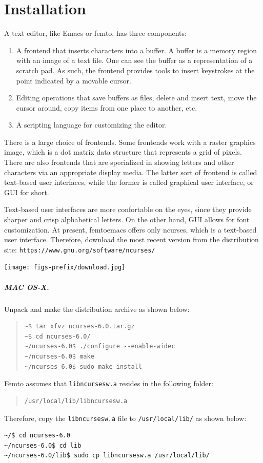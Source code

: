 \documentclass[a4paper,12pt]{book}
\begin{document}
\chapter{Installation}  
A text editor, like Emacs or femto, has three components:
\begin{enumerate}
\item A frontend that inserts characters into a buffer.
A buffer is a memory region with an image of a
text file. One can see the buffer as a representation
of a scratch pad. As such, the frontend provides tools to
insert keystrokes at the  point indicated by 
a movable cursor.
\item Editing operations that save buffers
as files, delete and insert text, move the
cursor around, copy items from one place to another, etc.
\item A scripting language for customizing the editor.
\end{enumerate}

There is a large choice of frontends. Some frontends 
work with a raster graphics image, which  is a dot matrix 
data structure that represents a grid of pixels. 
There are also frontends that are specialized in
showing letters and other characters via an appropriate
display media. The latter sort of frontend is called
text-based user interfaces, while the former is called
graphical user interface, or GUI for short.

Text-based user interfaces are more
confortable on the eyes, since they  provide
sharper and crisp alphabetical letters.
On the other hand, GUI allows for font 
customization. At present,
femtoemacs offers only ncurses, which
is a text-based user interface.
Therefore, download the most recent version 
from the distribution site:
\verb|https://www.gnu.org/software/ncurses/|

\texttt{[image: figs-prefix/download.jpg]}


\paragraph{MAC OS-X.}
Unpack and make the distribution archive as shown below:
\begin{quote}
\begin{verbatim}
~$ tar xfvz ncurses-6.0.tar.gz
~$ cd ncurses-6.0/
~/ncurses-6.0$ ./configure --enable-widec
~/ncurses-6.0$ make
~/ncurses-6.0$ sudo make install
\end{verbatim}
\end{quote}
Femto assumes that  \verb|libncursesw.a|
resides in the following folder:
\begin{quote}
\begin{verbatim}
/usr/local/lib/libncursesw.a 
\end{verbatim}
\end{quote}
Therefore, copy the \verb|libncursesw.a| file
to \verb|/usr/local/lib/| as shown below:
\begin{verbatim}
~/$ cd ncurses-6.0 
~/ncurses-6.0$ cd lib 
~/ncurses-6.0/lib$ sudo cp libncursesw.a /usr/local/lib/
\end{verbatim}
\end{document}
